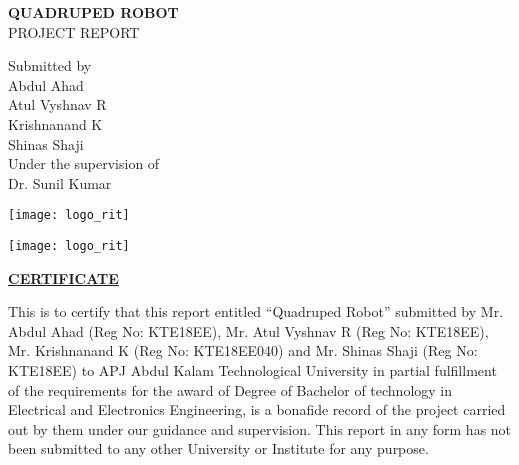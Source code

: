 \documentclass[12pt,a4paper]{report}
\begin{document}
\begin{center}
\vspace{4cm}
{\Huge \textbf{QUADRUPED ROBOT}}\\

\vspace{2cm}
\Large PROJECT REPORT\\

\vspace{1.75cm}

Submitted by\\
\vspace{0.5cm}
\large Abdul Ahad\\
\large Atul Vyshnav R\\
\large Krishnanand K\\ 
\large Shinas Shaji\\
\vspace{1.5cm}
Under the supervision of\\
\large Dr. Sunil Kumar\\

\vspace{1cm}

\texttt{[image: logo\_rit]}

\vspace*{\fill}
\end{center}

\begin{center}

\end{center}

\newpage

\begin{center}
    \begin{center}   
        \texttt{[image: logo\_rit]}
    \end{center}
\vspace{0.5cm}

\vspace{2 cm}

\textbf{\underline{CERTIFICATE}}\\
\vspace{0.5cm}
\end{center}
This is to certify that this report entitled “Quadruped Robot” submitted by  Mr. Abdul Ahad (Reg No: KTE18EE), Mr. Atul Vyshnav R (Reg No: KTE18EE), Mr. Krishnanand K (Reg No: KTE18EE040) and Mr. Shinas Shaji (Reg No: KTE18EE) to APJ Abdul Kalam Technological University in partial fulfillment of the requirements for the award of Degree of Bachelor of technology in Electrical and Electronics Engineering, is a bonafide record of the project carried out by them under our guidance and supervision. This report in any form has not been submitted to any other University or Institute for any purpose. 
\end{document}
